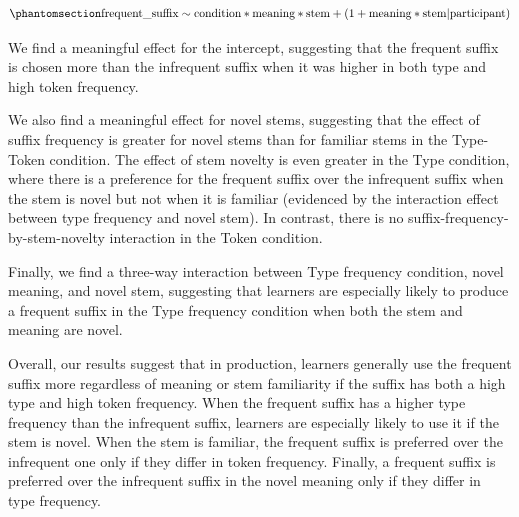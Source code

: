 \documentclass[
  letterpaper,
  DIV=11,
  numbers=noendperiod]{scrartcl}
\begin{document}
\begin{equation}\phantomsection\label{eq-prodmodelstem}{
\text{frequent\_suffix} \sim \text{condition}*\text{meaning}*\text{stem} + (1 + \text{meaning} * \text{stem} | \text{participant})
}\end{equation}

We find a meaningful effect for the intercept, suggesting that the
frequent suffix is chosen more than the infrequent suffix when it was
higher in both type and high token frequency.

We also find a meaningful effect for novel stems, suggesting that the
effect of suffix frequency is greater for novel stems than for familiar
stems in the Type-Token condition. The effect of stem novelty is even
greater in the Type condition, where there is a preference for the
frequent suffix over the infrequent suffix when the stem is novel but
not when it is familiar (evidenced by the interaction effect between
type frequency and novel stem). In contrast, there is no
suffix-frequency-by-stem-novelty interaction in the Token condition.

Finally, we find a three-way interaction between Type frequency
condition, novel meaning, and novel stem, suggesting that learners are
especially likely to produce a frequent suffix in the Type frequency
condition when both the stem and meaning are novel.

Overall, our results suggest that in production, learners generally use
the frequent suffix more regardless of meaning or stem familiarity if
the suffix has both a high type and high token frequency. When the
frequent suffix has a higher type frequency than the infrequent suffix,
learners are especially likely to use it if the stem is novel. When the
stem is familiar, the frequent suffix is preferred over the infrequent
one only if they differ in token frequency. Finally, a frequent suffix
is preferred over the infrequent suffix in the novel meaning only if
they differ in type frequency.
\end{document}
